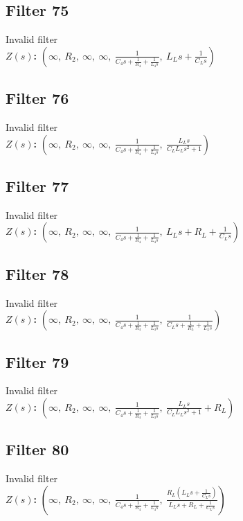 \documentclass{article}
\begin{document}
\subsection*{Filter 75}
Invalid filter \\ 
\textbf{$Z(s)$:} $\left( \infty, \  R_{2}, \  \infty, \  \infty, \  \frac{1}{C_{4} s + \frac{1}{R_{4}} + \frac{1}{L_{4} s}}, \  L_{L} s + \frac{1}{C_{L} s}\right)$ \\ 
\subsection*{Filter 76}
Invalid filter \\ 
\textbf{$Z(s)$:} $\left( \infty, \  R_{2}, \  \infty, \  \infty, \  \frac{1}{C_{4} s + \frac{1}{R_{4}} + \frac{1}{L_{4} s}}, \  \frac{L_{L} s}{C_{L} L_{L} s^{2} + 1}\right)$ \\ 
\subsection*{Filter 77}
Invalid filter \\ 
\textbf{$Z(s)$:} $\left( \infty, \  R_{2}, \  \infty, \  \infty, \  \frac{1}{C_{4} s + \frac{1}{R_{4}} + \frac{1}{L_{4} s}}, \  L_{L} s + R_{L} + \frac{1}{C_{L} s}\right)$ \\ 
\subsection*{Filter 78}
Invalid filter \\ 
\textbf{$Z(s)$:} $\left( \infty, \  R_{2}, \  \infty, \  \infty, \  \frac{1}{C_{4} s + \frac{1}{R_{4}} + \frac{1}{L_{4} s}}, \  \frac{1}{C_{L} s + \frac{1}{R_{L}} + \frac{1}{L_{L} s}}\right)$ \\ 
\subsection*{Filter 79}
Invalid filter \\ 
\textbf{$Z(s)$:} $\left( \infty, \  R_{2}, \  \infty, \  \infty, \  \frac{1}{C_{4} s + \frac{1}{R_{4}} + \frac{1}{L_{4} s}}, \  \frac{L_{L} s}{C_{L} L_{L} s^{2} + 1} + R_{L}\right)$ \\ 
\subsection*{Filter 80}
Invalid filter \\ 
\textbf{$Z(s)$:} $\left( \infty, \  R_{2}, \  \infty, \  \infty, \  \frac{1}{C_{4} s + \frac{1}{R_{4}} + \frac{1}{L_{4} s}}, \  \frac{R_{L} \left(L_{L} s + \frac{1}{C_{L} s}\right)}{L_{L} s + R_{L} + \frac{1}{C_{L} s}}\right)$ \\ 
\end{document}
